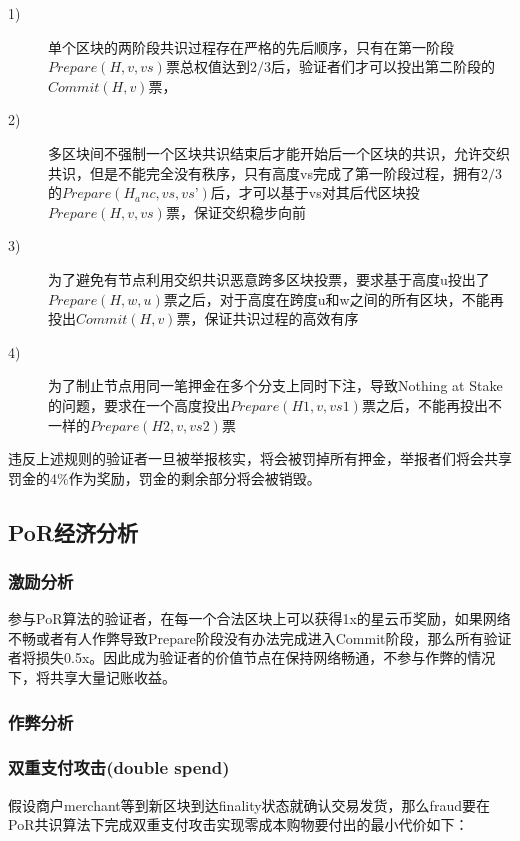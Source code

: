 \begin{description}
\item[1)] 单个区块的两阶段共识过程存在严格的先后顺序，只有在第一阶段$Prepare(H, v, vs)$票总权值达到$2/3$后，验证者们才可以投出第二阶段的$Commit(H, v)$票，
\item[2)] 多区块间不强制一个区块共识结束后才能开始后一个区块的共识，允许交织共识，但是不能完全没有秩序，只有高度vs完成了第一阶段过程，拥有$2/3$的$Prepare(H_anc, vs, vs’)$后，才可以基于vs对其后代区块投$Prepare(H, v, vs)$票，保证交织稳步向前
\item[3)] 为了避免有节点利用交织共识恶意跨多区块投票，要求基于高度u投出了$Prepare(H, w, u)$票之后，对于高度在跨度u和w之间的所有区块，不能再投出$Commit(H, v)$票，保证共识过程的高效有序
\item[4)] 为了制止节点用同一笔押金在多个分支上同时下注，导致Nothing at Stake的问题，要求在一个高度投出$Prepare(H1, v, vs1)$票之后，不能再投出不一样的$Prepare(H2, v, vs2)$票
\end{description}

违反上述规则的验证者一旦被举报核实，将会被罚掉所有押金，举报者们将会共享罚金的4\%作为奖励，罚金的剩余部分将会被销毁。

\subsection{PoR经济分析}
\label{por:economic}

\subsubsection{激励分析}
\label{por:economic:incentive}

参与PoR算法的验证者，在每一个合法区块上可以获得1x的星云币奖励，如果网络不畅或者有人作弊导致Prepare阶段没有办法完成进入Commit阶段，那么所有验证者将损失0.5x。因此成为验证者的价值节点在保持网络畅通，不参与作弊的情况下，将共享大量记账收益。

\subsubsection{作弊分析}
\label{por:economic:fraud}

\subsubsection*{双重支付攻击(double spend)}
\label{por:economic:fraud:double_spend}

假设商户merchant等到新区块到达finality状态就确认交易发货，那么fraud要在PoR共识算法下完成双重支付攻击实现零成本购物要付出的最小代价如下：

